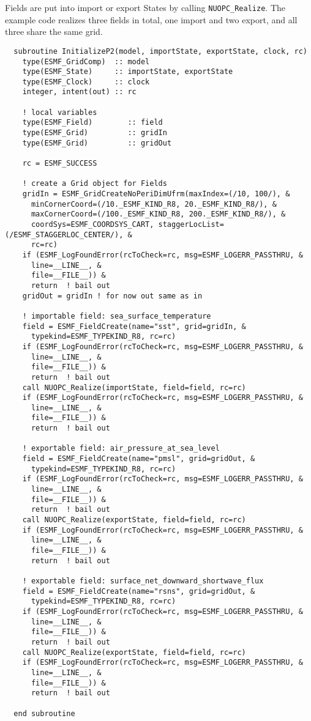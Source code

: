    Fields are put into import or export States by calling {\tt NUOPC\_Realize}.  
   The example code realizes three fields in total, one import and two export, 
   and all three share the same grid.
  

 \begin{verbatim}
  subroutine InitializeP2(model, importState, exportState, clock, rc)
    type(ESMF_GridComp)  :: model
    type(ESMF_State)     :: importState, exportState
    type(ESMF_Clock)     :: clock
    integer, intent(out) :: rc
    
    ! local variables    
    type(ESMF_Field)        :: field
    type(ESMF_Grid)         :: gridIn
    type(ESMF_Grid)         :: gridOut
    
    rc = ESMF_SUCCESS
    
    ! create a Grid object for Fields
    gridIn = ESMF_GridCreateNoPeriDimUfrm(maxIndex=(/10, 100/), &
      minCornerCoord=(/10._ESMF_KIND_R8, 20._ESMF_KIND_R8/), &
      maxCornerCoord=(/100._ESMF_KIND_R8, 200._ESMF_KIND_R8/), &
      coordSys=ESMF_COORDSYS_CART, staggerLocList=(/ESMF_STAGGERLOC_CENTER/), &
      rc=rc)
    if (ESMF_LogFoundError(rcToCheck=rc, msg=ESMF_LOGERR_PASSTHRU, &
      line=__LINE__, &
      file=__FILE__)) &
      return  ! bail out
    gridOut = gridIn ! for now out same as in

    ! importable field: sea_surface_temperature
    field = ESMF_FieldCreate(name="sst", grid=gridIn, &
      typekind=ESMF_TYPEKIND_R8, rc=rc)
    if (ESMF_LogFoundError(rcToCheck=rc, msg=ESMF_LOGERR_PASSTHRU, &
      line=__LINE__, &
      file=__FILE__)) &
      return  ! bail out
    call NUOPC_Realize(importState, field=field, rc=rc)
    if (ESMF_LogFoundError(rcToCheck=rc, msg=ESMF_LOGERR_PASSTHRU, &
      line=__LINE__, &
      file=__FILE__)) &
      return  ! bail out

    ! exportable field: air_pressure_at_sea_level
    field = ESMF_FieldCreate(name="pmsl", grid=gridOut, &
      typekind=ESMF_TYPEKIND_R8, rc=rc)
    if (ESMF_LogFoundError(rcToCheck=rc, msg=ESMF_LOGERR_PASSTHRU, &
      line=__LINE__, &
      file=__FILE__)) &
      return  ! bail out
    call NUOPC_Realize(exportState, field=field, rc=rc)
    if (ESMF_LogFoundError(rcToCheck=rc, msg=ESMF_LOGERR_PASSTHRU, &
      line=__LINE__, &
      file=__FILE__)) &
      return  ! bail out

    ! exportable field: surface_net_downward_shortwave_flux
    field = ESMF_FieldCreate(name="rsns", grid=gridOut, &
      typekind=ESMF_TYPEKIND_R8, rc=rc)
    if (ESMF_LogFoundError(rcToCheck=rc, msg=ESMF_LOGERR_PASSTHRU, &
      line=__LINE__, &
      file=__FILE__)) &
      return  ! bail out
    call NUOPC_Realize(exportState, field=field, rc=rc)
    if (ESMF_LogFoundError(rcToCheck=rc, msg=ESMF_LOGERR_PASSTHRU, &
      line=__LINE__, &
      file=__FILE__)) &
      return  ! bail out

  end subroutine
 
\end{verbatim}
 
